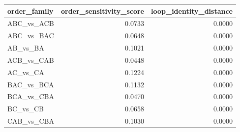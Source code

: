\begin{tabular}{lrr}
\toprule
order_family & order_sensitivity_score & loop_identity_distance \\
\midrule
ABC_vs_ACB & 0.0733 & 0.0000 \\
ABC_vs_BAC & 0.0648 & 0.0000 \\
AB_vs_BA & 0.1021 & 0.0000 \\
ACB_vs_CAB & 0.0448 & 0.0000 \\
AC_vs_CA & 0.1224 & 0.0000 \\
BAC_vs_BCA & 0.1132 & 0.0000 \\
BCA_vs_CBA & 0.0470 & 0.0000 \\
BC_vs_CB & 0.0658 & 0.0000 \\
CAB_vs_CBA & 0.1030 & 0.0000 \\
\bottomrule
\end{tabular}
